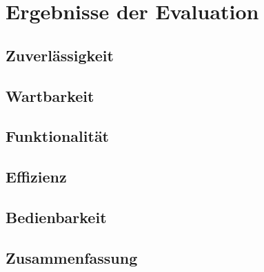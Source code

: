 \section{Ergebnisse der Evaluation}
		
		\subsection{Zuverlässigkeit}
		
		\subsection{Wartbarkeit}
		
		\subsection{Funktionalität}
		
		\subsection{Effizienz}
		
		\subsection{Bedienbarkeit}
		
		\subsection{Zusammenfassung}

